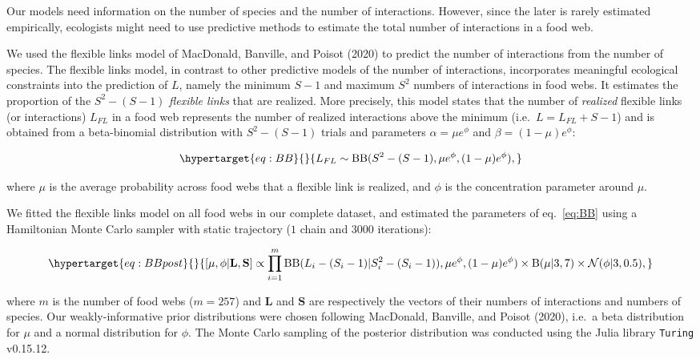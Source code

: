 \documentclass[11pt]{article}
\begin{document}
Our models need information on the number of species and the number of
interactions. However, since the later is rarely estimated empirically,
ecologists might need to use predictive methods to estimate the total
number of interactions in a food web.

We used the flexible links model of MacDonald, Banville, and Poisot
(2020) to predict the number of interactions from the number of species.
The flexible links model, in contrast to other predictive models of the
number of interactions, incorporates meaningful ecological constraints
into the prediction of \(L\), namely the minimum \(S-1\) and maximum
\(S^2\) numbers of interactions in food webs. It estimates the
proportion of the \(S^2 - (S - 1)\) \emph{flexible links} that are
realized. More precisely, this model states that the number of
\emph{realized} flexible links (or interactions) \(L_{FL}\) in a food
web represents the number of realized interactions above the minimum
(i.e.~\(L = L_{FL} + S - 1\)) and is obtained from a beta-binomial
distribution with \(S^2 - (S - 1)\) trials and parameters
\(\alpha = \mu e^\phi\) and \(\beta = (1 - \mu) e^\phi\):

\begin{equation}\protect\hypertarget{eq:BB}{}{L_{FL} \sim \mathrm{BB}(S^2 - (S - 1), \mu e^\phi, (1 - \mu) e^\phi),}\label{eq:BB}\end{equation}

where \(\mu\) is the average probability across food webs that a
flexible link is realized, and \(\phi\) is the concentration parameter
around \(\mu\).

We fitted the flexible links model on all food webs in our complete
dataset, and estimated the parameters of eq.~\ref{eq:BB} using a
Hamiltonian Monte Carlo sampler with static trajectory (\(1\) chain and
\(3000\) iterations):

\begin{equation}\protect\hypertarget{eq:BBpost}{}{ [\mu, \phi| \textbf{L}, \textbf{S}] \propto \prod_{i = 1}^{m} \mathrm{BB}(L_i - (S_i - 1) | S_i^2 - (S_i - 1)), \mu e^{\phi}, (1 - \mu) e^\phi) \times \mathrm{B}(\mu| 3 , 7 ) \times \mathcal{N}(\phi | 3, 0.5), }\label{eq:BBpost}\end{equation}

where \(m\) is the number of food webs (\(m = 257\)) and \(\textbf{L}\)
and \(\textbf{S}\) are respectively the vectors of their numbers of
interactions and numbers of species. Our weakly-informative prior
distributions were chosen following MacDonald, Banville, and Poisot
(2020), i.e.~a beta distribution for \(\mu\) and a normal distribution
for \(\phi\). The Monte Carlo sampling of the posterior distribution was
conducted using the Julia library \texttt{Turing} v0.15.12.
\end{document}
